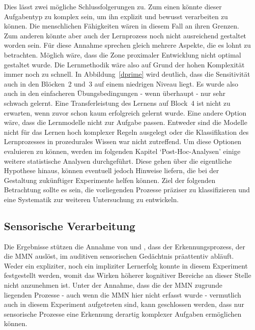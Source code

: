 \documentclass[doc,a4paper,12pt]{apa6}
\begin{document}
Dies lässt zwei mögliche Schlussfolgerungen zu. Zum einen könnte dieser Aufgabentyp zu komplex sein, um ihn explizit und bewusst verarbeiten zu können. Die menschlichen Fähigkeiten wären in diesem Fall an ihren Grenzen. Zum anderen könnte aber auch der Lernprozess noch nicht ausreichend gestaltet worden sein. Für diese Annahme sprechen gleich mehrere Aspekte, die es lohnt zu betrachten. Möglich wäre, dass die Zone proximaler Entwicklung \parencite{kozulin2003vygotsky} nicht optimal gestaltet wurde. Die Lernmethodik wäre also auf Grund der hohen Komplexität immer noch zu schnell. In Abbildung~\ref{dprime} wird deutlich, dass die Sensitivität auch in den Blöcken~2 und~3 auf einem niedrigen Niveau liegt. Es wurde also auch in den einfacheren Übungsbedingungen - wenn überhaupt - nur sehr schwach gelernt. Eine Transferleistung des Lernens auf Block~4 ist nicht zu erwarten, wenn zuvor schon kaum erfolgreich gelernt wurde. Eine andere Option wäre, dass die Lernmodelle nicht zur Aufgabe passen. Entweder sind die Modelle nicht für das Lernen hoch komplexer Regeln ausgelegt oder die Klassifikation des Lernprozesses in prozedurales Wissen war nicht zutreffend. Um diese Optionen evaluieren zu können, werden im folgenden Kapitel `Post-Hoc-Analysen' einige weitere statistische Analysen durchgeführt. Diese gehen über die eigentliche Hypothese hinaus, können eventuell jedoch Hinweise liefern, die bei der Gestaltung zukünftiger Experimente helfen können. Ziel der folgenden Betrachtung sollte es sein, die vorliegenden Prozesse präziser zu klassifizieren und eine Systematik zur weiteren Untersuchung zu entwickeln.

\subsection{Sensorische Verarbeitung}

Die Ergebnisse stützen die Annahme von \textcite{paavilainen2007preattentive} und \textcite{bendixen2008rapid}, dass der Erkennungsprozess, der die MMN auslöst, im auditiven sensorischen Gedächtnis präattentiv abläuft. Weder ein expliziter, noch ein impliziter Lernerfolg konnte in diesem Experiment festgestellt werden, womit das Wirken höherer kognitiver Bereiche an dieser Stelle nicht anzunehmen ist. Unter der Annahme, dass die der MMN zugrunde liegenden Prozesse - auch wenn die MMN hier nicht erfasst wurde - vermutlich auch in diesem Experiment aufgetreten sind, kann geschlossen werden, dass nur sensorische Prozesse eine Erkennung derartig komplexer Aufgaben ermöglichen können.
\end{document}

